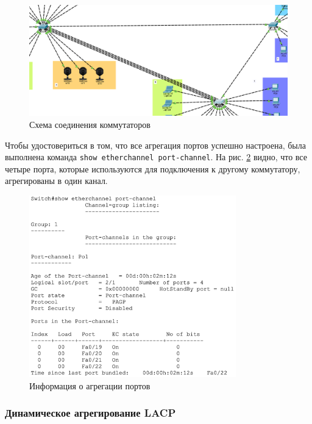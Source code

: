 \documentclass[a4paper, 14pt]{extarticle}
\begin{document}
\begin{figure}[H]
  \centering
  \includegraphics[width=\textwidth]{images/ec/scheme-after.png}
  \caption{Схема соединения коммутаторов}
  \label{fig:ec-scheme-after}
\end{figure}

Чтобы удостовериться в том, что все агрегация портов успешно настроена, была
выполнена команда \texttt{show etherchannel port-channel}. На рис.
\ref{fig:ec-port-channel} видно, что все четыре порта, которые используются для
подключения к другому коммутатору, агрегированы в один канал.

\begin{figure}[H]
  \centering
  \includegraphics[width=0.8\textwidth]{images/ec/port-channel.png}
  \caption{Информация о агрегации портов}
  \label{fig:ec-port-channel}
\end{figure}

\subsubsection{Динамическое агрегирование LACP}
\end{document}
